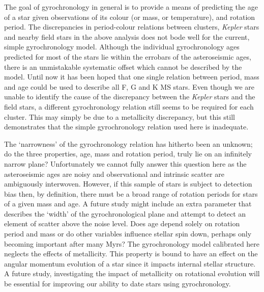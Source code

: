 The goal of gyrochronology in general is to provide a means of predicting the
age of a star given observations of its colour (or mass, or temperature), and
rotation period.
The discrepancies in period-colour relations between clusters, {\it Kepler}
stars and nearby field stars in the above analysis does not bode well for the
current, simple gyrochronology model.
Although the individual gyrochronology ages predicted for most of the \kepler
stars lie within the errobars of the asteroseismic ages, there is an
unmistakable systematic offset which cannot be described by the model.
Until now it has been hoped that one single relation between period, mass and
age could be used to describe all F, G and K MS stars.
Even though we are unable to identify the cause of the discrepancy between the
{\it Kepler} stars and the field stars, a different gyrochronology relation
still seems to be required for each cluster.
This may simply be due to a metallicity discrepancy, but this still
demonstrates that the simple gyrochronology relation used here is inadequate.

The `narrowness' of the gyrochronology relation has hitherto been an unknown;
do the three properties, age, mass and rotation period, truly lie on an
infinitely narrow plane?
Unfortunately we cannot fully answer this question here as the asteroseismic
ages are noisy and observational and intrinsic scatter are ambiguously
interwoven.
However, if this sample of stars is subject to detection bias then, by
definition, there must be a broad range of rotation periods for stars of a
given mass and age.
A future study might include an extra parameter that describes the `width' of
the gyrochronological plane and attempt to detect an element of scatter above
the noise level.
Does age depend solely on rotation period and mass or do other variables
influence stellar spin down, perhaps only becoming important after many Myrs?
The gyrochronology model calibrated here neglects the effects of metallicity.
This property is bound to have an effect on the angular momentum evolution
of a star since it impacts internal stellar structure.
A future study, investigating the impact of metallicity on rotational evolution
will be essential for improving our ability to date stars using gyrochronology.

